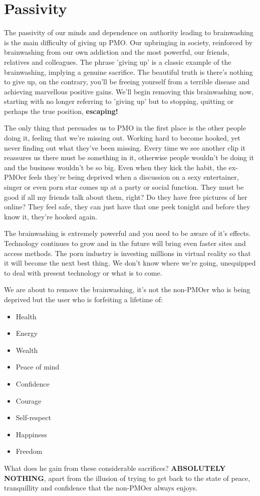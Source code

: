 \documentclass[easypeasy.tex]{subfiles}
\begin{document}
\section{Passivity}
The passivity of our minds and dependence on authority leading to brainwashing is the main difficulty of giving up PMO. Our upbringing in society, reinforced by brainwashing from our own addiction and the most powerful, our friends, relatives and colleagues. The phrase 'giving up' is a classic example of the brainwashing, implying a genuine sacrifice. The beautiful truth is there's nothing to give up, on the contrary, you'll be freeing yourself from a terrible disease and achieving marvellous positive gains. We'll begin removing this brainwashing now, starting with no longer referring to 'giving up' but to stopping, quitting or perhaps the true position, \textbf{escaping!}

The only thing that persuades us to PMO in the first place is the other people doing it, feeling that we're missing out. Working hard to become hooked, yet never finding out what they've been missing. Every time we see another clip it reassures us there must be something in it, otherwise people wouldn't be doing it and the business wouldn't be so big. Even when they kick the habit, the ex-PMOer feels they're being deprived when a discussion on a sexy entertainer, singer or even  porn star comes up at a party or social function. They must be good if all my friends talk about them, right? Do they have free pictures of her online? They feel safe, they can just have that one peek tonight and before they know it, they're hooked again.

The brainwashing is extremely powerful and you need to be aware of it's effects. Technology continues to grow and in the future will bring even faster sites and access methods. The porn industry is investing millions in virtual reality so that it will become the next best thing. We don't know where we're going, unequipped to deal with present technology or what is to come.

We are about to remove the brainwashing, it's not the non-PMOer who is being deprived but the user who is forfeiting a lifetime of:
\begin{itemize}
  \item Health
  \item Energy
  \item Wealth
  \item Peace of mind
  \item Confidence
  \item Courage
  \item Self-respect
  \item Happiness
  \item Freedom
\end{itemize}
What does he gain from these considerable sacrifices? \textbf{ABSOLUTELY NOTHING}, apart from the illusion of trying to get back to the state of peace, tranquillity and confidence that the non-PMOer always enjoys.
\end{document}
